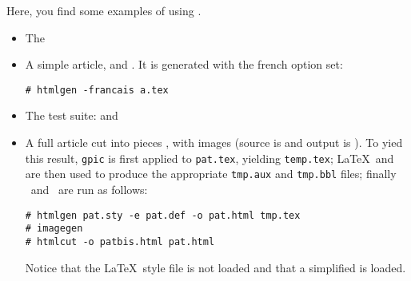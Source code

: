 \documentclass{article}
\begin{document}
Here, you find some examples of using \hevea.
\begin{itemize}
\item The 
\item A simple article,   and . It is
generated with the french option set:
\begin{verbatim}
# htmlgen -francais a.tex
\end{verbatim}
\item The test suite:  and 
\item A full article cut into pieces , with images (source is 
and output is ). To yied this result, \verb+gpic+ is first
applied to \verb+pat.tex+, yielding \verb+temp.tex+; \LaTeX\ and
\BibTeX are then used to produce the appropriate \verb+tmp.aux+ and
\verb+tmp.bbl+ files; finally \hevea\ and \htmlcut\ are run as
follows:
\begin{verbatim}
# htmlgen pat.sty -e pat.def -o pat.html tmp.tex
# imagegen
# htmlcut -o patbis.html pat.html 
\end{verbatim}
Notice that the \LaTeX\ style file  is not loaded and
that a simplified  is loaded.

\end{itemize}
\end{document}
